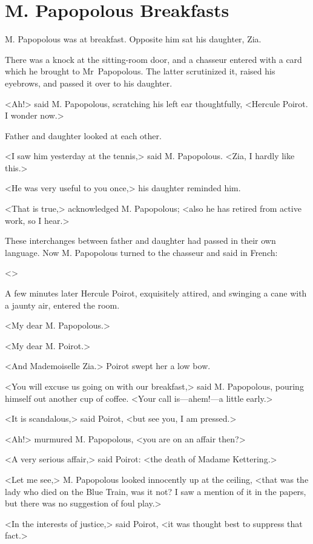 \chapter{M. Papopolous Breakfasts}


\lettrine{M}{.} Papopolous was at breakfast. Opposite him sat his daughter, Zia.

\zz
There was a knock at the sitting-room door, and a chasseur entered with a card which he brought to Mr~Papopolous. The latter scrutinized it, raised his eyebrows, and passed it over to his daughter.

<Ah!> said M. Papopolous, scratching his left ear thoughtfully, <Hercule Poirot. I wonder now.>

Father and daughter looked at each other.

<I saw him yesterday at the tennis,> said M. Papopolous. <Zia, I hardly like this.>

<He was very useful to you once,> his daughter reminded him.

<That is true,> acknowledged M. Papopolous; <also he has retired from active work, so I hear.>

These interchanges between father and daughter had passed in their own language. Now M. Papopolous turned to the chasseur and said in French:

<>

A few minutes later Hercule Poirot, exquisitely attired, and swinging a cane with a jaunty air, entered the room.

<My dear M. Papopolous.>

<My dear M. Poirot.>

<And Mademoiselle Zia.> Poirot swept her a low bow.

<You will excuse us going on with our breakfast,> said M. Papopolous, pouring himself out another cup of coffee. <Your call is—ahem!—a little early.>

<It is scandalous,> said Poirot, <but see you, I am pressed.>

<Ah!> murmured M. Papopolous, <you are on an affair then?>

<A very serious affair,> said Poirot: <the death of Madame Kettering.>

<Let me see,> M. Papopolous looked innocently up at the ceiling, <that was the lady who died on the Blue Train, was it not? I saw a mention of it in the papers, but there was no suggestion of foul play.>

<In the interests of justice,> said Poirot, <it was thought best to suppress that fact.>

